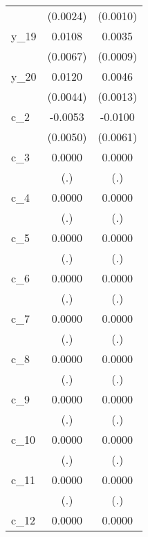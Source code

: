 {\begin{tabular}{l*{2}{c}}
            &    (0.0024)        &    (0.0010)        \\
[1em]
y\_19        &      0.0108        &      0.0035\sym{**}\\
            &    (0.0067)        &    (0.0009)        \\
[1em]
y\_20        &      0.0120\sym{**}&      0.0046\sym{**}\\
            &    (0.0044)        &    (0.0013)        \\
[1em]
c\_2         &     -0.0053        &     -0.0100\sym{*} \\
            &    (0.0050)        &    (0.0061)        \\
[1em]
c\_3         &      0.0000        &      0.0000        \\
            &         (.)        &         (.)        \\
[1em]
c\_4         &      0.0000        &      0.0000        \\
            &         (.)        &         (.)        \\
[1em]
c\_5         &      0.0000        &      0.0000        \\
            &         (.)        &         (.)        \\
[1em]
c\_6         &      0.0000        &      0.0000        \\
            &         (.)        &         (.)        \\
[1em]
c\_7         &      0.0000        &      0.0000        \\
            &         (.)        &         (.)        \\
[1em]
c\_8         &      0.0000        &      0.0000        \\
            &         (.)        &         (.)        \\
[1em]
c\_9         &      0.0000        &      0.0000        \\
            &         (.)        &         (.)        \\
[1em]
c\_10        &      0.0000        &      0.0000        \\
            &         (.)        &         (.)        \\
[1em]
c\_11        &      0.0000        &      0.0000        \\
            &         (.)        &         (.)        \\
[1em]
c\_12        &      0.0000        &      0.0000        \\

\end{tabular}}
